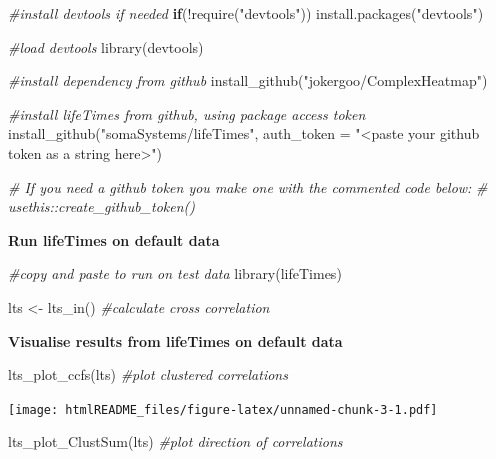 \documentclass[
]{article}
\newenvironment{Shaded}{\begin{snugshade}}{\end{snugshade}}
\newcommand{\AttributeTok}[1]{\textcolor[rgb]{0.77,0.63,0.00}{#1}}
\newcommand{\CommentTok}[1]{\textcolor[rgb]{0.56,0.35,0.01}{\textit{#1}}}
\newcommand{\ControlFlowTok}[1]{\textcolor[rgb]{0.13,0.29,0.53}{\textbf{#1}}}
\newcommand{\FunctionTok}[1]{\textcolor[rgb]{0.00,0.00,0.00}{#1}}
\newcommand{\NormalTok}[1]{#1}
\newcommand{\OtherTok}[1]{\textcolor[rgb]{0.56,0.35,0.01}{#1}}
\newcommand{\SpecialCharTok}[1]{\textcolor[rgb]{0.00,0.00,0.00}{#1}}
\newcommand{\StringTok}[1]{\textcolor[rgb]{0.31,0.60,0.02}{#1}}
\begin{document}
\begin{Shaded}
\begin{Highlighting}[]
\CommentTok{\#install devtools if needed}
\ControlFlowTok{if}\NormalTok{(}\SpecialCharTok{!}\FunctionTok{require}\NormalTok{(}\StringTok{"devtools"}\NormalTok{)) }\FunctionTok{install.packages}\NormalTok{(}\StringTok{"devtools"}\NormalTok{)}

\CommentTok{\#load devtools}
\FunctionTok{library}\NormalTok{(devtools)}

\CommentTok{\#install dependency from github}
\FunctionTok{install\_github}\NormalTok{(}\StringTok{"jokergoo/ComplexHeatmap"}\NormalTok{)}

\CommentTok{\#install lifeTimes from github, using package access token}
\FunctionTok{install\_github}\NormalTok{(}\StringTok{"somaSystems/lifeTimes"}\NormalTok{, }
\AttributeTok{auth\_token =} \StringTok{"\textless{}paste your github token as a string here\textgreater{}"}\NormalTok{) }

\CommentTok{\# If you need a github token you make one with the commented code below:}
\CommentTok{\# usethis::create\_github\_token() }
\end{Highlighting}
\end{Shaded}

\textbf{Run lifeTimes on default data}

\begin{Shaded}
\begin{Highlighting}[]
\CommentTok{\#copy and paste to run on test data}
\FunctionTok{library}\NormalTok{(lifeTimes)}

\NormalTok{lts }\OtherTok{\textless{}{-}} \FunctionTok{lts\_in}\NormalTok{() }\CommentTok{\#calculate cross correlation}
\end{Highlighting}
\end{Shaded}

\textbf{Visualise results from lifeTimes on default data}

\begin{Shaded}
\begin{Highlighting}[]
\FunctionTok{lts\_plot\_ccfs}\NormalTok{(lts) }\CommentTok{\#plot clustered correlations}
\end{Highlighting}
\end{Shaded}

\texttt{[image: htmlREADME\_files/figure-latex/unnamed-chunk-3-1.pdf]}

\begin{Shaded}
\begin{Highlighting}[]
\FunctionTok{lts\_plot\_ClustSum}\NormalTok{(lts) }\CommentTok{\#plot direction of correlations}
\end{Highlighting}
\end{Shaded}
\end{document}
